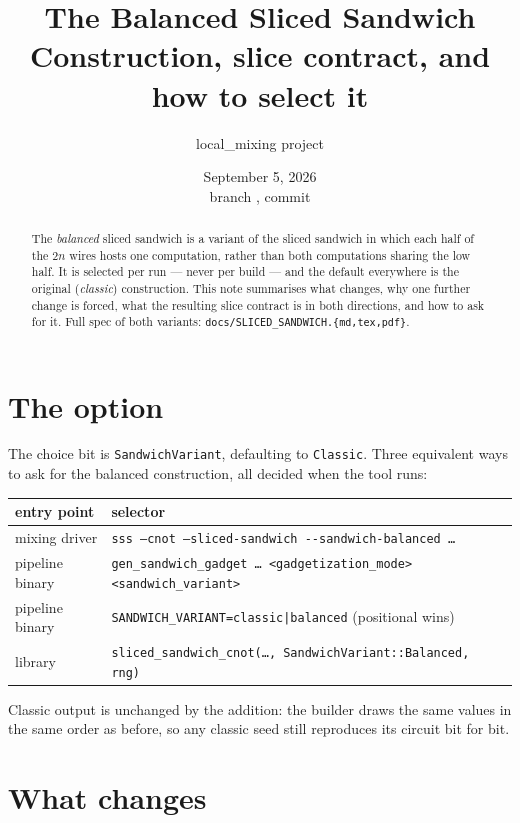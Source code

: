 \documentclass[11pt]{article}
\title{\textbf{The Balanced Sliced Sandwich}\\[2pt]
\large Construction, slice contract, and how to select it}
\author{local\_mixing project}
\date{September 5, 2026 \\ \small branch \code{drip-reshuffle}, commit \code{b38a438f}}
\newcommand{\code}[1]{\texttt{#1}}
\begin{document}
\maketitle

\begin{abstract}
\noindent The \emph{balanced} sliced sandwich is a variant of the sliced
sandwich in which each half of the $2n$ wires hosts one computation, rather
than both computations sharing the low half. It is selected per run --- never
per build --- and the default everywhere is the original (\emph{classic})
construction. This note summarises what changes, why one further change is
forced, what the resulting slice contract is in both directions, and how to
ask for it. Full spec of both variants: \code{docs/SLICED\_SANDWICH.\{md,tex,pdf\}}.
\end{abstract}

\section{The option}

The choice bit is \code{SandwichVariant}, defaulting to \code{Classic}. Three
equivalent ways to ask for the balanced construction, all decided when the tool
runs:

\begin{center}
\begin{tabular}{ll}
\toprule
entry point & selector \\
\midrule
mixing driver & \code{sss --cnot --sliced-sandwich {-}{-}sandwich-balanced \dots} \\
pipeline binary & \code{gen\_sandwich\_gadget \dots\ <gadgetization\_mode> <sandwich\_variant>} \\
pipeline binary & \code{SANDWICH\_VARIANT=classic|balanced} (positional wins) \\
library & \code{sliced\_sandwich\_cnot(\dots, SandwichVariant::Balanced, rng)} \\
\bottomrule
\end{tabular}
\end{center}

\noindent Classic output is unchanged by the addition: the builder draws the
same values in the same order as before, so any classic seed still reproduces
its circuit bit for bit.

\section{What changes}
\end{document}
